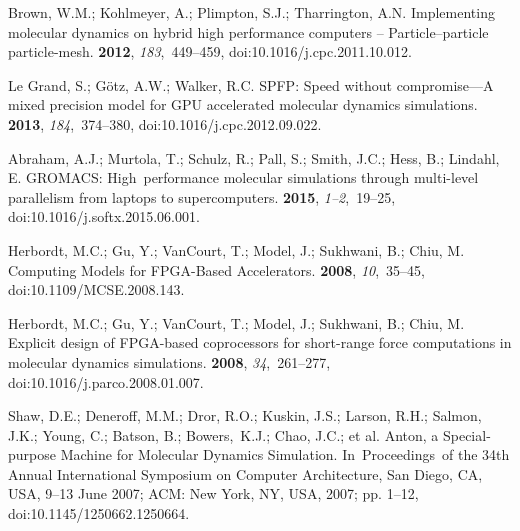 \documentclass[computation,article,accept,moreauthors,pdftex]{Definitions/mdpi}
\begin{document}
\begin{thebibliography}{999}
Brown, W.M.; Kohlmeyer, A.; Plimpton, S.J.; Tharrington, A.N.
\newblock Implementing molecular dynamics on hybrid high performance computers
 – Particle–particle particle-mesh.
 {\bf 2012}, {\em 183},~449--459, doi:10.1016/j.cpc.2011.10.012.

{Le Grand}, S.; G\"otz, A.W.; Walker, R.C.
\newblock SPFP: Speed without compromise---A mixed precision model for GPU
 accelerated molecular dynamics simulations.
 {\bf 2013}, {\em 184},~374--380, doi:10.1016/j.cpc.2012.09.022.

Abraham, A.J.; Murtola, T.; Schulz, R.; Pall, S.; Smith, J.C.; Hess, B.;
 Lindahl, E.
\newblock GROMACS: High~performance molecular simulations through multi-level
 parallelism from laptops to supercomputers.
 {\bf 2015}, {\em 1--2},~19--25, doi:10.1016/j.softx.2015.06.001.

Herbordt, M.C.; Gu, Y.; VanCourt, T.; Model, J.; Sukhwani, B.; Chiu, M.
\newblock Computing Models for FPGA-Based Accelerators.
 {\bf 2008}, {\em 10},~35--45, doi:10.1109/MCSE.2008.143.

Herbordt, M.C.; Gu, Y.; VanCourt, T.; Model, J.; Sukhwani, B.; Chiu, M.
\newblock Explicit design of FPGA-based coprocessors for short-range force
 computations in molecular dynamics simulations.
 {\bf 2008}, {\em 34},~261--277, doi:10.1016/j.parco.2008.01.007.

Shaw, D.E.; Deneroff, M.M.; Dror, R.O.; Kuskin, J.S.; Larson, R.H.; Salmon,
 J.K.; Young, C.; Batson, B.; Bowers,~K.J.; Chao, J.C.; et al.
\newblock Anton, a Special-purpose Machine for Molecular Dynamics Simulation.
\newblock In~Proceedings~of the 34th Annual International Symposium on Computer
 Architecture, San Diego, CA, USA, 9--13 June 2007; ACM: New York, NY, USA, 2007; pp. 1--12, doi:10.1145/1250662.1250664.


\end{thebibliography}
\end{document}

